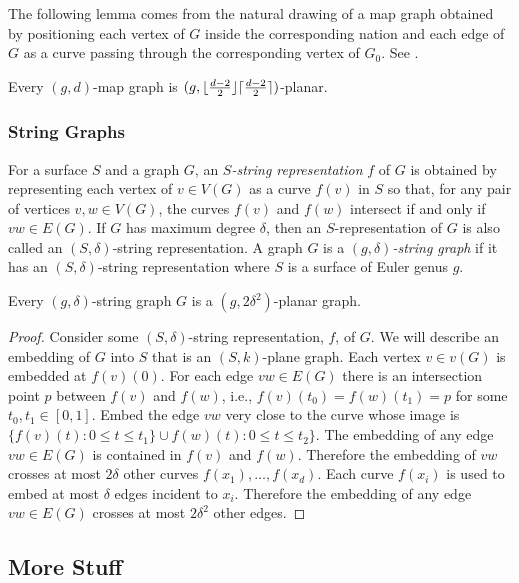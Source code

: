 \documentclass{patmorin}
\begin{document}
The following lemma comes from the natural drawing of a map graph obtained by positioning each vertex of $G$ inside the corresponding nation and each edge of $G$ as a curve passing through the corresponding vertex of $G_0$. See \citet[Page~4]{dujmovic.eppstein.ea:structure}.

\begin{lem}
  Every $(g, d)$-map graph is $(g, {\lfloor \frac{d-2}{2} \rfloor}{\lceil \frac{d-2}{2} \rceil})$-planar.
\end{lem}

\subsubsection{String Graphs}

For a surface $S$ and a graph $G$, an \emph{$S$-string representation} $f$ of $G$ is obtained by representing each vertex of $v\in V(G)$ as a curve $f(v)$ in $S$ so that, for any pair of vertices $v,w\in V(G)$, the curves $f(v)$ and $f(w)$ intersect if and only if $vw\in E(G)$.  If $G$ has maximum degree $\delta$, then an $S$-representation of $G$ is also called an $(S,\delta)$-string representation.  A graph $G$ is a \emph{$(g,\delta)$-string graph} if it has an $(S,\delta)$-string representation where $S$ is a surface of Euler genus $g$.

\begin{lem}
  Every $(g,\delta)$-string graph $G$ is a $(g,2\delta^2)$-planar graph.
\end{lem}

\begin{proof}
  Consider some $(S,\delta)$-string representation, $f$, of $G$.  We will describe an embedding of $G$ into $S$ that is an $(S,k)$-plane graph.  Each vertex $v\in v(G)$ is embedded at $f(v)(0)$. For each edge $vw\in E(G)$ there is an intersection point $p$ between $f(v)$ and $f(w)$, i.e., $f(v)(t_0)=f(w)(t_1)=p$ for some $t_0,t_1\in[0,1]$.  Embed the edge $vw$ very close to the curve whose image is $\{f(v)(t): 0\le t\le t_1\}\cup f(w)(t): 0 \le t\le t_2\}$. The embedding of any edge $vw\in E(G)$ is contained in $f(v)$ and $f(w)$.  Therefore the embedding of $vw$ crosses at most $2\delta$ other curves $f(x_1),\ldots,f(x_d)$.  Each curve $f(x_i)$ is used to embed at most $\delta$ edges incident to $x_i$.  Therefore the embedding of any edge $vw\in E(G)$ crosses at most $2\delta^2$ other edges.  
\end{proof}




\subsection{More Stuff}
\end{document}
